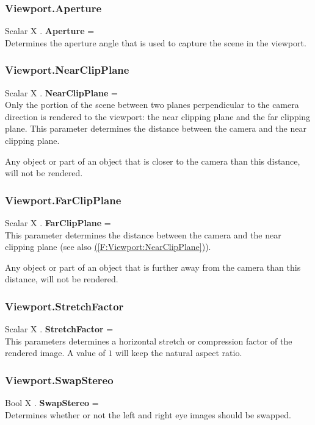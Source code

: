\documentclass[10pt]{book}
\newcommand{\linkitem}[1]{\hyperref[#1]{\nameref{#1} (\ref{#1})}}
\begin{document}
\subsubsection{Viewport.Aperture \label{F:Viewport:Aperture}}
Scalar X . \textbf{Aperture} = \\
Determines the aperture angle that is used to capture the scene in the viewport.

\subsubsection{Viewport.NearClipPlane \label{F:Viewport:NearClipPlane}}
Scalar X . \textbf{NearClipPlane} = \\
Only the portion of the scene between two planes perpendicular to the camera direction is rendered to the viewport: the near clipping plane and the far clipping plane. This parameter determines the distance between the camera and the near clipping plane.

Any object or part of an object that is closer to the camera than this distance, will not be rendered.

\subsubsection{Viewport.FarClipPlane \label{F:Viewport:FarClipPlane}}
Scalar X . \textbf{FarClipPlane} = \\
This parameter determines the distance between the camera and the near clipping plane (see also \linkitem{F:Viewport:NearClipPlane}).

Any object or part of an object that is further away from the camera than this distance, will not be rendered.

\subsubsection{Viewport.StretchFactor \label{F:Viewport:StretchFactor}}
Scalar X . \textbf{StretchFactor} = \\
This parameters determines a horizontal stretch or compression factor of the rendered image. A value of $1$ will keep the natural aspect ratio.

\subsubsection{Viewport.SwapStereo \label{F:Viewport:SwapStereo}}
Bool X . \textbf{SwapStereo} = \\
Determines whether or not the left and right eye images should be swapped.
\end{document}
